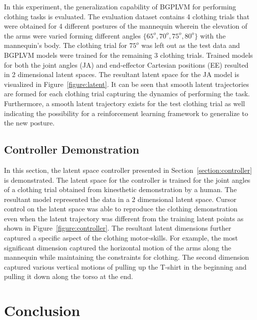 \documentclass[a4paper]{article}
\begin{document}
In this experiment, the generalization capability of BGPLVM for performing clothing tasks is evaluated. The evaluation dataset contains 4 clothing trials that were obtained for 4 different postures of the mannequin wherein the elevation of the arms were varied forming different angles $\{65^o, 70^o, 75^o, 80^o\}$ with the mannequin's body. The clothing trial for $75^o$ was left out as the test data and BGPLVM models were trained for the remaining 3 clothing trials. Trained models for both the joint angles (JA) and end-effector Cartesian positions (EE) resulted in 2 dimensional latent spaces. The resultant latent space for the JA model is visualized in Figure~\ref{figure:latent}. It can be seen that smooth latent trajectories are formed for each clothing trial capturing the dynamics of performing the task. Furthermore, a smooth latent trajectory exists for the test clothing trial as well indicating the possibility for a reinforcement learning framework to generalize to the new posture.

\subsection{Controller Demonstration}
\label{section:controllerres}

In this section, the latent space controller presented in Section~\ref{section:controller} is demonstrated. The latent space for the controller is trained for the joint angles of a clothing trial obtained from kinesthetic demonstration by a human. The resultant model represented the data in a 2 dimensional latent space. Cursor control on the latent space was able to reproduce the clothing demonstration even when the latent trajectory was different from the training latent points as shown in Figure~\ref{figure:controller}. The resultant latent dimensions further captured a specific aspect of the clothing motor-skills. For example, the most significant dimension captured the horizontal motion of the arms along the mannequin while maintaining the constraints for clothing. The second dimension captured various vertical motions of pulling up the T-shirt in the beginning and pulling it down along the torso at the end.

\section{Conclusion}
\label{section:conclusion}
\end{document}
